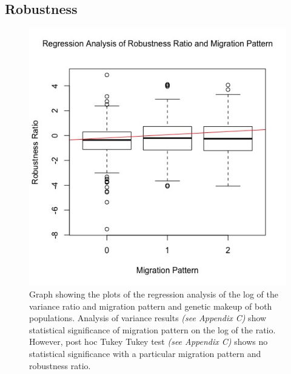 \subsection{Robustness}
\begin{figure}[h!]
\centering
\includegraphics[scale=0.40]{../Results/robust_regression.jpg} \caption{Graph showing the plots of the regression analysis of the log of the variance ratio and migration pattern and genetic makeup of both populations. Analysis of variance results \textit{(see Appendix C)} show statistical significance of migration pattern on the log of the ratio. However, post hoc Tukey Tukey test \textit{(see Appendix C)} shows no statistical significance with a particular migration pattern and robustness ratio.} \label{fig: Regression}
\end{figure}
